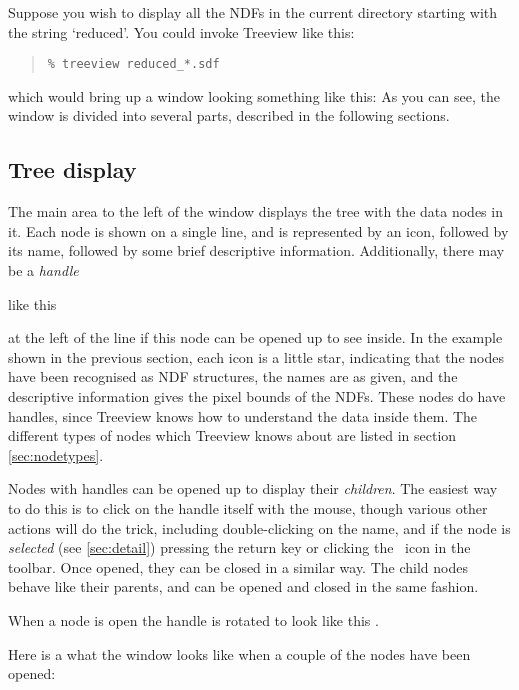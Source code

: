 \documentclass[twoside,11pt]{article}
\renewcommand{\_}{\texttt{\symbol{95}}}
\begin{document}
Suppose you wish to display all the NDFs in the current directory
starting with the string `reduced\_'.  You could invoke Treeview like this:
\begin{quote}
\begin{verbatim}
% treeview reduced_*.sdf
\end{verbatim}
\end{quote}
which would bring up a window looking something like this:
As you can see, the window is divided into several parts,
described in the following sections.

\subsection{Tree display}

The main area to the left of the window displays the tree with the
data nodes in it.  Each node is shown on a single line,
and is represented by an icon,
followed by its name, followed by some brief descriptive information.
Additionally, there may be a {\em handle} 
\begin{htmlonly}
like this \iconHandleClosed\  
\end{htmlonly}
at the left of the line
if this node can be opened up to see inside.
In the example shown in the previous section, 
each icon is a little star, indicating that the nodes
have been recognised as NDF structures, the names are as given,
and the descriptive information gives the pixel bounds of the NDFs.
These nodes do have handles, since Treeview knows how to understand
the data inside them.
The different types of nodes which Treeview knows about are listed
in section \ref{sec:nodetypes}.

Nodes with handles can be opened up to display their {\em children}.
The easiest way to do this is to click on the handle itself with
the mouse, though various other actions will do the trick, 
including double-clicking on the name, and if the node is 
{\em selected} (see \ref{sec:detail}) pressing the return key or clicking
the \iconOpen\ icon in the toolbar.  Once opened, they can be
closed in a similar way.  The child nodes behave like their
parents, and can be opened and closed in the same fashion.
\begin{htmlonly}
When a node is open the handle is rotated to look like this
\iconHandleOpen.
\end{htmlonly}

Here is a what the window looks like when a couple of the nodes
have been opened:
\end{document}
